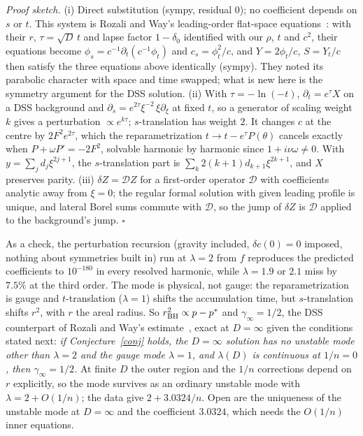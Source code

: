 \documentclass[aps,prd,onecolumn,superscriptaddress,nofootinbib,10pt]{revtex4-2}
\begin{document}
\emph{Proof sketch.} (i) Direct substitution (sympy, residual $0$); no coefficient depends on $s$ or $t$. This system is
Rozali and Way's leading-order flat-space equations~\cite{RozaliWay2018}: with their $r$, $\tau = \sqrt D\,t$ and lapse factor
$1 - \delta_0$ identified with our $\rho$, $t$ and $c^2$, their equations become $\phi_s = c^{-1}\partial_t(c^{-1}\phi_t)$ and
$c_s = \phi_t^2/c$, and $Y = 2\phi_t/c$, $S = Y_t/c$ then satisfy the three equations above identically (sympy). They
noted its parabolic character with space and time swapped; what is new here is the symmetry argument for the DSS
solution. (ii) With
$\tau = -\ln(-t)$, $\partial_t = e^\tau X$ on a DSS background and $\partial_s = e^{2\tau}\xi^{-2}\,\xi\partial_\xi$ at fixed $t$, so a generator of
scaling weight $k$ gives a perturbation $\propto e^{k\tau}$; $s$-translation has weight $2$. It changes $c$ at the centre by
$2F^2e^{2\tau}$, which the reparametrization $t \to t - e^\tau P(\theta)$ cancels exactly when $P + \omega P' = -2F^2$, solvable
harmonic by harmonic since $1 + i\nu\omega \ne 0$. With $y = \sum_j d_j\xi^{2j+1}$, the $s$-translation part is
$\sum_k 2(k+1)d_{k+1}\xi^{2k+1}$, and $X$ preserves parity. (iii) $\delta Z = \mathcal D Z$ for a first-order operator $\mathcal D$ with
coefficients analytic away from $\xi = 0$; the regular formal solution with given leading profile is unique, and lateral
Borel sums commute with $\mathcal D$, so the jump of $\delta Z$ is $\mathcal D$ applied to the background's jump. $\square$

As a check, the perturbation recursion (gravity included, $\delta c(0) = 0$ imposed, nothing about symmetries built in) run at
$\lambda = 2$ from $f$ reproduces the predicted coefficients to $10^{-180}$ in every resolved harmonic, while $\lambda = 1.9$ or $2.1$
miss by $7.5\%$ at the third order. The mode is physical, not gauge: the reparametrization is gauge and $t$-translation
($\lambda = 1$) shifts the accumulation time, but $s$-translation shifts $r^2$, with $r$ the areal radius. So
$r_{\rm BH}^2 \propto p - p^*$ and $\gamma_\infty = 1/2$, the DSS counterpart of Rozali and Way's estimate~\cite{RozaliWay2018}, exact at
$D = \infty$ given the conditions stated next:
\emph{if Conjecture~\ref{conj} holds, the $D = \infty$ solution has no unstable mode other than $\lambda = 2$ and the gauge mode
$\lambda = 1$, and $\lambda(D)$ is continuous at $1/n = 0$, then $\gamma_\infty = 1/2$.} At finite $D$ the outer region and the $1/n$
corrections depend on $r$ explicitly, so the mode survives as an ordinary unstable mode with $\lambda = 2 + O(1/n)$; the data
give $2 + 3.0324/n$. Open are the uniqueness of the unstable mode at $D = \infty$ and the coefficient $3.0324$, which needs
the $O(1/n)$ inner equations.
\end{document}
